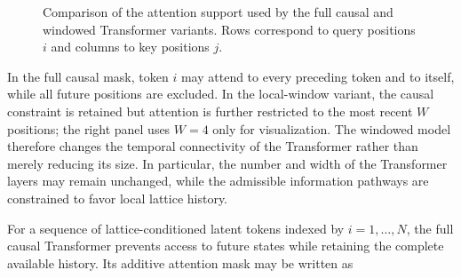 \begin{figure}[htbp]
{
}

\vspace{0.3cm}

\caption{ Comparison of the attention support used by the full causal and windowed Transformer variants. Rows correspond to query positions $i$ and columns to key positions $j$.}
\label{fig:causal_window_masks}

\end{figure}

In the full causal mask, token $i$ may attend to every preceding token and to itself, while all future positions are excluded. In the local-window variant, the causal constraint is retained but attention is further restricted to the most recent $W$ positions; the right panel uses $W=4$ only for visualization. The windowed model therefore changes the temporal connectivity of the Transformer rather than merely reducing its size. In particular, the number and width of the Transformer layers may remain unchanged, while the admissible information pathways are constrained to favor local lattice history.

For a sequence of lattice-conditioned latent tokens indexed by
$i=1,\ldots,N$, the full causal Transformer prevents access to future
states while retaining the complete available history. Its additive
attention mask may be written as

